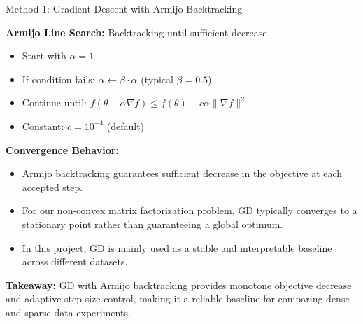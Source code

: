\documentclass[aspectratio=169,usenames,dvipsnames]{beamer}
\begin{document}
\begin{frame}{Method 1: Gradient Descent with Armijo Backtracking}

\textbf{Armijo Line Search:} Backtracking until sufficient decrease

\begin{itemize}
    \item Start with $\alpha = 1$
    \item If condition fails: $\alpha \leftarrow \beta \cdot \alpha$ (typical $\beta = 0.5$)
    \item Continue until: $f(\theta - \alpha \nabla f) \leq f(\theta) - c \alpha \|\nabla f\|^2$
    \item Constant: $c = 10^{-4}$ (default)
\end{itemize}

\vspace{0.4cm}

\textbf{Convergence Behavior:}

\begin{itemize}
    \item Armijo backtracking guarantees sufficient decrease in the objective at each accepted step.
    \item For our non-convex matrix factorization problem, GD typically converges to a stationary point rather than guaranteeing a global optimum.
    \item In this project, GD is mainly used as a stable and interpretable baseline across different datasets.
\end{itemize}

\vspace{0.4cm}

\textbf{Takeaway:} GD with Armijo backtracking provides monotone objective decrease and adaptive step-size control, making it a reliable baseline for comparing dense and sparse data experiments.

\end{frame}
\end{document}
